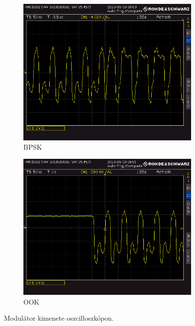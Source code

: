 \begin{figure}[H]
	\centering
	\begin{subfigure}[b]{0.49\textwidth}
		\includegraphics[width=\textwidth,keepaspectratio]{kepek/SCOPE16.PNG}
		\caption{BPSK}
		\label{fig:modulator_bpsk_scope}
	\end{subfigure}
	\begin{subfigure}[b]{0.49\textwidth}
		\includegraphics[width=\textwidth,keepaspectratio]{kepek/SCOPE15.PNG}
		\caption{OOK}
		\label{fig:modulator_ook_scope}
	\end{subfigure}
	\caption{Modulátor kimenete oszcilloszkópon.}
	\label{fig:modulator_scope}
\end{figure}

